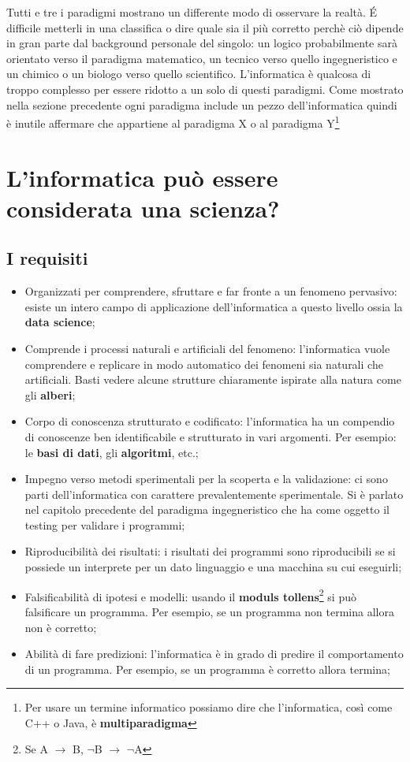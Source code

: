Tutti e tre i paradigmi mostrano un differente modo di osservare la realtà. É difficile metterli in una classifica o dire quale sia il più corretto perchè ciò dipende in gran parte dal background personale del singolo: un logico probabilmente sarà orientato verso il paradigma matematico, un tecnico verso quello ingegneristico e un chimico o un biologo verso quello scientifico. L'informatica è qualcosa di troppo complesso per essere ridotto a un solo di questi paradigmi. Come mostrato nella sezione precedente ogni paradigma include un pezzo dell'informatica quindi è inutile affermare che appartiene al paradigma X o al paradigma Y\footnote{Per usare un termine informatico possiamo dire che l'informatica, così come C++ o Java, è \textbf{multiparadigma}}

\section{L'informatica può essere considerata una scienza?}

\subsection{I requisiti}

\begin{itemize}
    \item Organizzati per comprendere, sfruttare e far fronte a un fenomeno pervasivo: esiste un intero campo di applicazione dell'informatica a questo livello ossia la \textbf{data science};
    \item Comprende i processi naturali e artificiali del fenomeno: l'informatica vuole comprendere e replicare in modo automatico dei fenomeni sia naturali che artificiali. Basti vedere alcune strutture chiaramente ispirate alla natura come gli \textbf{alberi}; 
    \item Corpo di conoscenza strutturato e codificato: l'informatica ha un compendio di conoscenze ben identificabile e strutturato in vari argomenti. Per esempio: le \textbf{basi di dati}, gli \textbf{algoritmi}, etc.;
    \item Impegno verso metodi sperimentali per la scoperta e la validazione: ci sono parti dell'informatica con carattere prevalentemente sperimentale. Si è parlato nel capitolo precedente del paradigma ingegneristico che ha come oggetto il testing per validare i programmi;
    \item Riproducibilità dei risultati: i risultati dei programmi sono riproducibili se si possiede un interprete per un dato linguaggio e una macchina su cui eseguirli;
    \item Falsificabilità di ipotesi e modelli: usando il \textbf{moduls tollens}\footnote{Se A $\rightarrow$ B, $\neg$B $\rightarrow$ $\neg$A} si può falsificare un programma. Per esempio, se un programma non termina allora non è corretto;
    \item Abilità di fare predizioni: l'informatica è in grado di predire il comportamento di un programma. Per esempio, se un programma è corretto allora termina;
\end{itemize}

